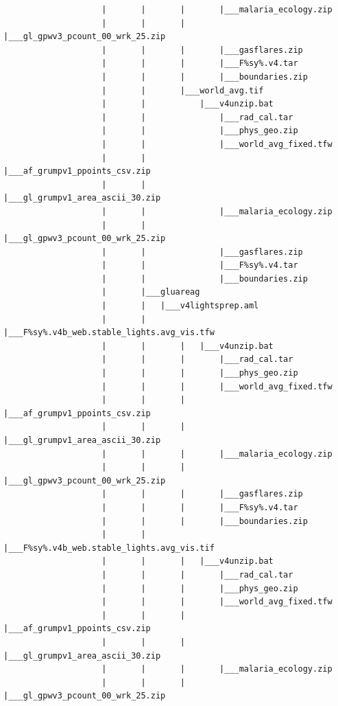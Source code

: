 \documentclass[
]{book}
\begin{document}
\begin{verbatim}
                    |       |       |       |___malaria_ecology.zip
                    |       |       |       |___gl_gpwv3_pcount_00_wrk_25.zip
                    |       |       |       |___gasflares.zip
                    |       |       |       |___F%sy%.v4.tar
                    |       |       |       |___boundaries.zip
                    |       |       |___world_avg.tif
                    |       |           |___v4unzip.bat
                    |       |               |___rad_cal.tar
                    |       |               |___phys_geo.zip
                    |       |               |___world_avg_fixed.tfw
                    |       |               |___af_grumpv1_ppoints_csv.zip
                    |       |               |___gl_grumpv1_area_ascii_30.zip
                    |       |               |___malaria_ecology.zip
                    |       |               |___gl_gpwv3_pcount_00_wrk_25.zip
                    |       |               |___gasflares.zip
                    |       |               |___F%sy%.v4.tar
                    |       |               |___boundaries.zip
                    |       |___gluareag
                    |       |   |___v4lightsprep.aml
                    |       |       |___F%sy%.v4b_web.stable_lights.avg_vis.tfw
                    |       |       |   |___v4unzip.bat
                    |       |       |       |___rad_cal.tar
                    |       |       |       |___phys_geo.zip
                    |       |       |       |___world_avg_fixed.tfw
                    |       |       |       |___af_grumpv1_ppoints_csv.zip
                    |       |       |       |___gl_grumpv1_area_ascii_30.zip
                    |       |       |       |___malaria_ecology.zip
                    |       |       |       |___gl_gpwv3_pcount_00_wrk_25.zip
                    |       |       |       |___gasflares.zip
                    |       |       |       |___F%sy%.v4.tar
                    |       |       |       |___boundaries.zip
                    |       |       |___F%sy%.v4b_web.stable_lights.avg_vis.tif
                    |       |       |   |___v4unzip.bat
                    |       |       |       |___rad_cal.tar
                    |       |       |       |___phys_geo.zip
                    |       |       |       |___world_avg_fixed.tfw
                    |       |       |       |___af_grumpv1_ppoints_csv.zip
                    |       |       |       |___gl_grumpv1_area_ascii_30.zip
                    |       |       |       |___malaria_ecology.zip
                    |       |       |       |___gl_gpwv3_pcount_00_wrk_25.zip

\end{verbatim}
\end{document}
